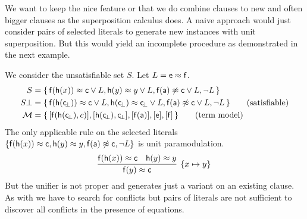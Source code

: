 %

\noindent We want to keep the nice feature or \InstGen 
that we do combine clauses to new and often bigger clauses
as the superposition calculus does.
A naive approach would just consider pairs of selected literals 
to generate new instances with unit superposition.
But this would yield an incomplete procedure 
as demonstrated in the next example.

\newcommand{\myset}[1]{\{ \, #1 \, \}}
\newcommand{\mysub}[1]{\{ #1 \}}

\begin{example}\label{ex:naive:inst:gen:eq}
	We consider the unsatisfiable set \( S \). Let \( L = \mathsf{e}\approx\mathsf{f} \).
	\begin{align*}
		S &= \myset{
			\mf(\mh(x)) \mEQ \mc \lor L, 
			\mh(y)\mEQ y \lor L, 
			\mf(\ma) \mNE \mc \lor L, 
			\lnot L
		}
		\\
		S\bot &= \myset{
			\mf(\mh(\consbot)) \mEQ \mc \lor L, 
			\mh(\consbot)\mEQ \consbot \lor L, 
			\mf(\ma) \mNE \mc \lor L,
			\lnot L
		}\tag{satisfiable}
		\\
		\mcM &= \myset{
			[\mf(\mh(\consbot),c)], [\mh(\consbot),\consbot], [\mf(\ma)], [\me], [\mf] 
		}\tag{term model}
	\end{align*}
	The only applicable rule on the selected literals 
	\(\{ 
		\mathsf{f}(\mathsf{h}(x)) \approx \mathsf{c},
		\mathsf{h}(y)\approx y,
		\mathsf{f}(\mathsf{a}) \not\approx \mathsf{c},
		\lnot L
	\}\)
	is unit paramodulation.
	\[
		\infer[\{ x\mapsto y \}]
		{\mf(y)\mEQ\mc}
		{\mf(\mh(x))\mEQ\mc & \mh(y)\mEQ y}
		\]
	But the unifier is not proper and generates just a variant on an existing clause.
	As with \InstGen we have to search for conflicts 
	but pairs of literals are not sufficient to discover 
	all conflicts in the presence of equations.
\end{example}

